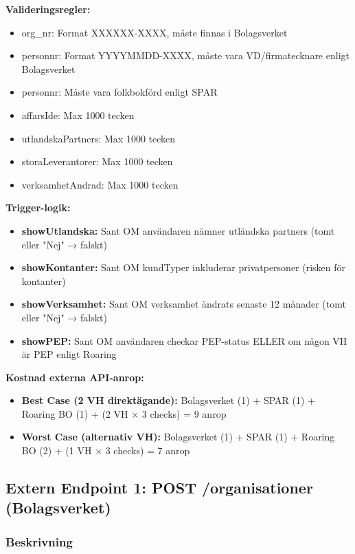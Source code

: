\textbf{Valideringsregler:}
\begin{itemize}[noitemsep]
  \item org\_nr: Format XXXXXX-XXXX, måste finnas i Bolagsverket
  \item personnr: Format YYYYMMDD-XXXX, måste vara VD/firmatecknare enligt Bolagsverket
  \item personnr: Måste vara folkbokförd enligt SPAR
  \item affarsIde: Max 1000 tecken
  \item utlandskaPartners: Max 1000 tecken
  \item storaLeverantorer: Max 1000 tecken
  \item verksamhetAndrad: Max 1000 tecken
\end{itemize}

\textbf{Trigger-logik:}
\begin{itemize}[noitemsep]
  \item \textbf{showUtlandska:} Sant OM användaren nämner utländska partners (tomt eller "Nej" → falskt)
  \item \textbf{showKontanter:} Sant OM kundTyper inkluderar privatpersoner (risken för kontanter)
  \item \textbf{showVerksamhet:} Sant OM verksamhet ändrats senaste 12 månader (tomt eller "Nej" → falskt)
  \item \textbf{showPEP:} Sant OM användaren checkar PEP-status ELLER om någon VH är PEP enligt Roaring
\end{itemize}

\textbf{Kostnad externa API-anrop:}
\begin{itemize}[noitemsep]
  \item \textbf{Best Case (2 VH direktägande):} Bolagsverket (1) + SPAR (1) + Roaring BO (1) + (2 VH × 3 checks) = 9 anrop
  \item \textbf{Worst Case (alternativ VH):} Bolagsverket (1) + SPAR (1) + Roaring BO (2) + (1 VH × 3 checks) = 7 anrop
\end{itemize}

\subsection{Extern Endpoint 1: POST /organisationer (Bolagsverket)}

\subsubsection{Beskrivning}

